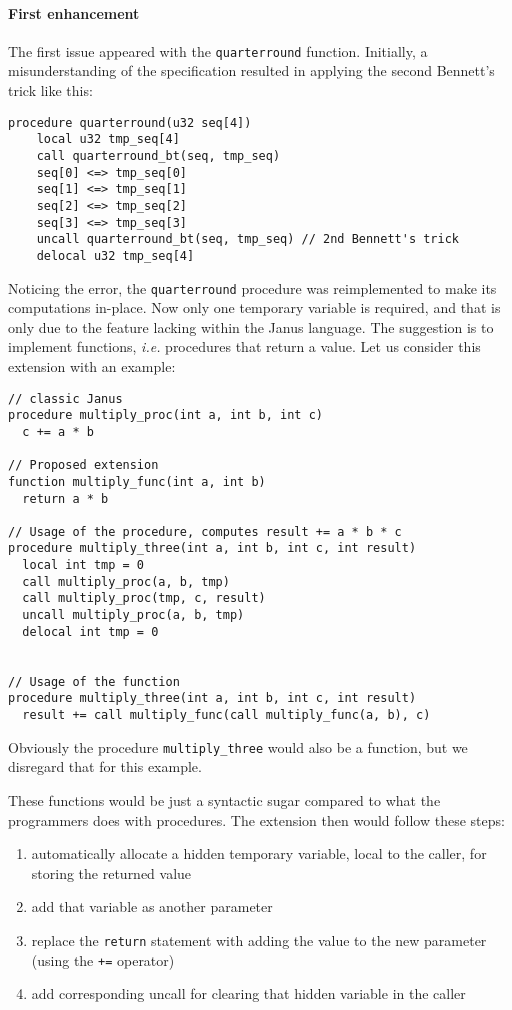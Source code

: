 \documentclass[a4paper,10pt,openright]{memoir}
\newcommand{\ie}{\emph{i.e.}\xspace}
\newcommand{\code}[1]{\texttt{#1}}
\begin{document}
\paragraph{First enhancement}

The first issue appeared with the \code{quarterround} function. Initially, a 
misunderstanding of the specification resulted in applying the second 
Bennett's trick like this:

\begin{lstlisting}[language=Janus]
procedure quarterround(u32 seq[4])
	local u32 tmp_seq[4]
	call quarterround_bt(seq, tmp_seq)
	seq[0] <=> tmp_seq[0]
	seq[1] <=> tmp_seq[1]
	seq[2] <=> tmp_seq[2]
	seq[3] <=> tmp_seq[3]
	uncall quarterround_bt(seq, tmp_seq) // 2nd Bennett's trick
	delocal u32 tmp_seq[4]
\end{lstlisting}

Noticing the error, the \code{quarterround} procedure was reimplemented 
to make its computations in-place. Now only one temporary variable is 
required, and that is only due to the feature lacking within the Janus 
language. The suggestion is to implement functions, \ie procedures that 
return a value. Let us consider this extension with an example:

\begin{lstlisting}[language=Janus]
// classic Janus
procedure multiply_proc(int a, int b, int c)
  c += a * b

// Proposed extension
function multiply_func(int a, int b)
  return a * b

// Usage of the procedure, computes result += a * b * c
procedure multiply_three(int a, int b, int c, int result)
  local int tmp = 0
  call multiply_proc(a, b, tmp)
  call multiply_proc(tmp, c, result)
  uncall multiply_proc(a, b, tmp)
  delocal int tmp = 0


// Usage of the function
procedure multiply_three(int a, int b, int c, int result)
  result += call multiply_func(call multiply_func(a, b), c)
\end{lstlisting}

Obviously the procedure \code{multiply\_three} would also be a function, 
but we disregard that for this example.

These functions would be just a syntactic sugar compared to what the 
programmers does with procedures. The extension then would follow these 
steps:

\begin{enumerate}
\item automatically allocate a hidden temporary variable, local to the caller, for storing the returned value
\item add that variable as another parameter
\item replace the \code{return} statement with adding the value to the new parameter (using the \code{+=} operator)
\item add corresponding uncall for clearing that hidden variable in the caller
\end{enumerate}
\end{document}
